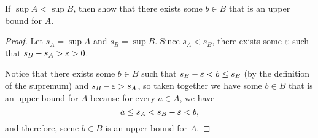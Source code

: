 \begin{problem} \label{prob:sup-upper-bound}
  If $\sup A < \sup B$, then show that there exists some $b \in B$ that is an upper bound for $A$.
\end{problem}

\begin{proof}
  Let $s_A = \sup A$ and $s_B = \sup B$. Since $s_A < s_B$, there exists some
  $\varepsilon$ such that $s_B - s_A > \varepsilon > 0$. 

  Notice that there exists some $b \in B$ such that $s_B - \varepsilon < b \leq s_B$
  (by the definition of the supremum) and $s_B - \varepsilon > s_A$, so taken together
  we have some $b \in B$ that is an upper bound for $A$ because for every $a \in A$, we have
  \[
    a \leq s_A < s_B - \varepsilon < b,
  \]
  and therefore, some $b \in B$ is an upper bound for $A$.
\end{proof}
